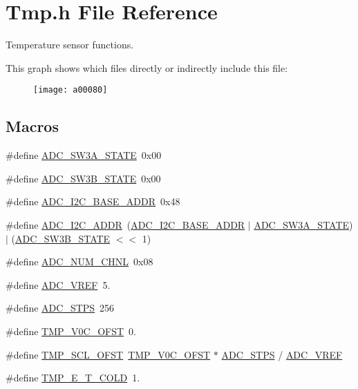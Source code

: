 \hypertarget{a00058}{\section{Tmp.\-h File Reference}
\label{a00058}
}


Temperature sensor functions.  


This graph shows which files directly or indirectly include this file\-:\nopagebreak
\begin{figure}[H]
\begin{center}
\leavevmode
\texttt{[image: a00080]}
\end{center}
\end{figure}
\subsection*{Macros}
\begin{DoxyCompactItemize}
\item 
\#define \hyperlink{a00058_ac80e67c94bf6570094bba2248b9586f3}{A\-D\-C\-\_\-\-S\-W3\-A\-\_\-\-S\-T\-A\-T\-E}~0x00
\item 
\#define \hyperlink{a00058_a63e298aff78f6afee6ebffa60c1de62a}{A\-D\-C\-\_\-\-S\-W3\-B\-\_\-\-S\-T\-A\-T\-E}~0x00
\item 
\#define \hyperlink{a00058_a6c0e4f915b6ac0c3af9a27d604f1f7b1}{A\-D\-C\-\_\-\-I2\-C\-\_\-\-B\-A\-S\-E\-\_\-\-A\-D\-D\-R}~0x48
\item 
\#define \hyperlink{a00058_a5fd3aabe18504a5314a5d0e71e3bc495}{A\-D\-C\-\_\-\-I2\-C\-\_\-\-A\-D\-D\-R}~(\hyperlink{a00058_a6c0e4f915b6ac0c3af9a27d604f1f7b1}{A\-D\-C\-\_\-\-I2\-C\-\_\-\-B\-A\-S\-E\-\_\-\-A\-D\-D\-R} $|$ \hyperlink{a00058_ac80e67c94bf6570094bba2248b9586f3}{A\-D\-C\-\_\-\-S\-W3\-A\-\_\-\-S\-T\-A\-T\-E}) $|$ (\hyperlink{a00058_a63e298aff78f6afee6ebffa60c1de62a}{A\-D\-C\-\_\-\-S\-W3\-B\-\_\-\-S\-T\-A\-T\-E} $<$$<$ 1)
\item 
\#define \hyperlink{a00058_a448e8a52be570dfe9fdddb2045039534}{A\-D\-C\-\_\-\-N\-U\-M\-\_\-\-C\-H\-N\-L}~0x08
\item 
\#define \hyperlink{a00058_a5a03d0b939a8dda552c9fe3319a82485}{A\-D\-C\-\_\-\-V\-R\-E\-F}~5.
\item 
\#define \hyperlink{a00058_a9be6401f8c9339711816bec5ca55dd88}{A\-D\-C\-\_\-\-S\-T\-P\-S}~256
\item 
\#define \hyperlink{a00058_a6d41a70e126c748f2c99c3ff8228eb1b}{T\-M\-P\-\_\-\-V0\-C\-\_\-\-O\-F\-S\-T}~0.
\item 
\#define \hyperlink{a00058_a0f910bb108922c8686a139977510af53}{T\-M\-P\-\_\-\-S\-C\-L\-\_\-\-O\-F\-S\-T}~\hyperlink{a00058_a6d41a70e126c748f2c99c3ff8228eb1b}{T\-M\-P\-\_\-\-V0\-C\-\_\-\-O\-F\-S\-T} $\ast$ \hyperlink{a00058_a9be6401f8c9339711816bec5ca55dd88}{A\-D\-C\-\_\-\-S\-T\-P\-S} / \hyperlink{a00058_a5a03d0b939a8dda552c9fe3319a82485}{A\-D\-C\-\_\-\-V\-R\-E\-F}
\item 
\#define \hyperlink{a00058_acc66f9f90ea4746679f5d26c834ddea5}{T\-M\-P\-\_\-\-E\-\_\-\-T\-\_\-\-C\-O\-L\-D}~1.
\end{DoxyCompactItemize}
